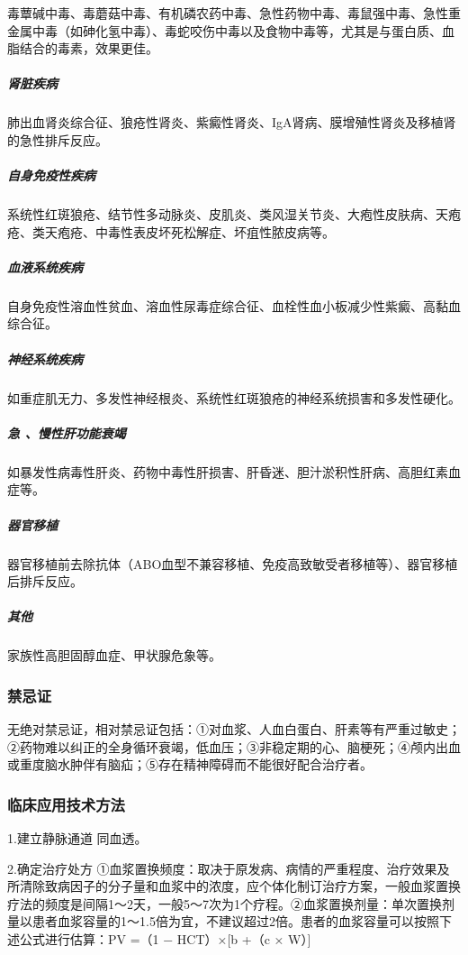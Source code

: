 毒蕈碱中毒、毒蘑菇中毒、有机磷农药中毒、急性药物中毒、毒鼠强中毒、急性重金属中毒（如砷化氢中毒）、毒蛇咬伤中毒以及食物中毒等，尤其是与蛋白质、血脂结合的毒素，效果更佳。

\subparagraph{肾脏疾病}

肺出血肾炎综合征、狼疮性肾炎、紫癜性肾炎、IgA肾病、膜增殖性肾炎及移植肾的急性排斥反应。

\subparagraph{自身免疫性疾病}

系统性红斑狼疮、结节性多动脉炎、皮肌炎、类风湿关节炎、大疱性皮肤病、天疱疮、类天疱疮、中毒性表皮坏死松解症、坏疽性脓皮病等。

\subparagraph{血液系统疾病}

自身免疫性溶血性贫血、溶血性尿毒症综合征、血栓性血小板减少性紫癜、高黏血综合征。

\subparagraph{神经系统疾病}

如重症肌无力、多发性神经根炎、系统性红斑狼疮的神经系统损害和多发性硬化。

\subparagraph{急 、慢性肝功能衰竭}

如暴发性病毒性肝炎、药物中毒性肝损害、肝昏迷、胆汁淤积性肝病、高胆红素血症等。

\subparagraph{器官移植}

器官移植前去除抗体（ABO血型不兼容移植、免疫高致敏受者移植等）、器官移植后排斥反应。

\subparagraph{其他}

家族性高胆固醇血症、甲状腺危象等。

\subsubsection{禁忌证}

无绝对禁忌证，相对禁忌证包括：①对血浆、人血白蛋白、肝素等有严重过敏史；②药物难以纠正的全身循环衰竭，低血压；③非稳定期的心、脑梗死；④颅内出血或重度脑水肿伴有脑疝；⑤存在精神障碍而不能很好配合治疗者。

\subsubsection{临床应用技术方法}

1.建立静脉通道 同血透。

2.确定治疗处方
①血浆置换频度：取决于原发病、病情的严重程度、治疗效果及所清除致病因子的分子量和血浆中的浓度，应个体化制订治疗方案，一般血浆置换疗法的频度是间隔1～2天，一般5～7次为1个疗程。②血浆置换剂量：单次置换剂量以患者血浆容量的1～1.5倍为宜，不建议超过2倍。患者的血浆容量可以按照下述公式进行估算：PV
=（1 − HCT）×{[}b +（c × W）{]}

